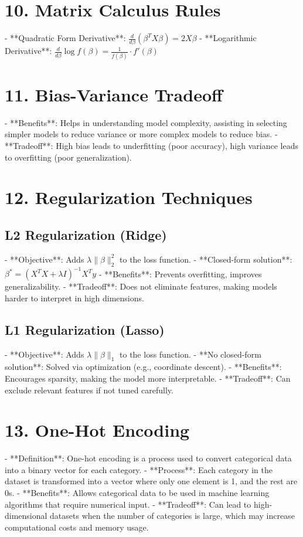 \documentclass[10pt]{article}
\begin{document}
\begin{multicols}{2}
\section*{10. Matrix Calculus Rules}
- **Quadratic Form Derivative**: $\frac{d}{d\beta} \left( \beta^T X \beta \right) = 2X\beta$
- **Logarithmic Derivative**: $\frac{d}{d\beta} \log f(\beta) = \frac{1}{f(\beta)} \cdot f'(\beta)$

\section*{11. Bias-Variance Tradeoff}
- **Benefits**: Helps in understanding model complexity, assisting in selecting simpler models to reduce variance or more complex models to reduce bias.
- **Tradeoff**: High bias leads to underfitting (poor accuracy), high variance leads to overfitting (poor generalization).

\section*{12. Regularization Techniques}
\subsection*{L2 Regularization (Ridge)}
- **Objective**: Adds $\lambda \|\beta\|_2^2$ to the loss function.
- **Closed-form solution**: $\beta^* = (X^TX + \lambda I)^{-1}X^Ty$
- **Benefits**: Prevents overfitting, improves generalizability.
- **Tradeoff**: Does not eliminate features, making models harder to interpret in high dimensions.

\subsection*{L1 Regularization (Lasso)}
- **Objective**: Adds $\lambda \|\beta\|_1$ to the loss function.
- **No closed-form solution**: Solved via optimization (e.g., coordinate descent).
- **Benefits**: Encourages sparsity, making the model more interpretable.
- **Tradeoff**: Can exclude relevant features if not tuned carefully.

\section*{13. One-Hot Encoding}
- **Definition**: One-hot encoding is a process used to convert categorical data into a binary vector for each category.
- **Process**: Each category in the dataset is transformed into a vector where only one element is 1, and the rest are 0s.
- **Benefits**: Allows categorical data to be used in machine learning algorithms that require numerical input.
- **Tradeoff**: Can lead to high-dimensional datasets when the number of categories is large, which may increase computational costs and memory usage.


\end{multicols}
\end{document}
